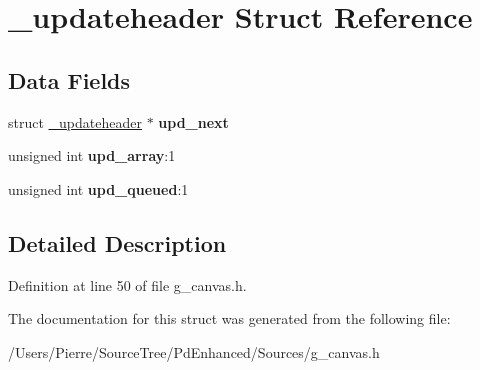\hypertarget{struct__updateheader}{\section{\-\_\-updateheader Struct Reference}
\label{struct__updateheader}
}
\subsection*{Data Fields}
\begin{DoxyCompactItemize}
\item 
\hypertarget{struct__updateheader_aa77eb2a8f6b20d6ec0d1af32fc1b3a7e}{struct \hyperlink{struct__updateheader}{\-\_\-updateheader} $\ast$ {\bfseries upd\-\_\-next}}\label{struct__updateheader_aa77eb2a8f6b20d6ec0d1af32fc1b3a7e}

\item 
\hypertarget{struct__updateheader_a028e2bd5a2c5de45da9944a5facdd5ea}{unsigned int {\bfseries upd\-\_\-array}\-:1}\label{struct__updateheader_a028e2bd5a2c5de45da9944a5facdd5ea}

\item 
\hypertarget{struct__updateheader_a36e3d6dd74f7684a1cb6f38796de106f}{unsigned int {\bfseries upd\-\_\-queued}\-:1}\label{struct__updateheader_a36e3d6dd74f7684a1cb6f38796de106f}

\end{DoxyCompactItemize}


\subsection{Detailed Description}


Definition at line 50 of file g\-\_\-canvas.\-h.



The documentation for this struct was generated from the following file\-:\begin{DoxyCompactItemize}
\item 
/\-Users/\-Pierre/\-Source\-Tree/\-Pd\-Enhanced/\-Sources/g\-\_\-canvas.\-h\end{DoxyCompactItemize}
